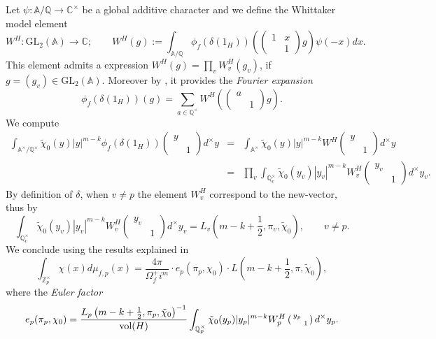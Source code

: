 \documentclass{amsart}
\newcommand{\GL}{{\mathrm{GL}}}
\newcommand{\Z}{{\mathbb Z}}
\newcommand{\A}{{\mathbb A}}
\newcommand{\Q}{{\mathbb Q}}
\newcommand{\C}{{\mathbb C}}
\begin{document}
Let $\psi:\A/\Q\rightarrow\C^\times$ be a global additive character and we define the Whittaker model element
\[
W^H:\GL_2(\A)\longrightarrow\C;\qquad W^H(g):=\int_{\A/\Q}\phi_f(\delta(1_H))\left(\left(\begin{array}{cc}1&x\\&1\end{array}\right)g\right)\psi(-x)dx.
\]
This element admits a expression $W^H(g)=\prod_vW^H_v(g_v)$, if $g=(g_v)\in\GL_2(\A)$. Moreover by \cite[Theorem 3.5.5]{Bump}, it provides the \emph{Fourier expansion} 
\[
\phi_f(\delta(1_H))(g)=\sum_{a\in\Q^\times}W^H\left(\left(\begin{array}{cc}a&\\&1\end{array}\right)g\right).
\]
We compute
\begin{eqnarray*}
\int_{\A^\times/\Q^\times}\tilde\chi_0(y)|y|^{m-k}\phi_f\left(\delta(1_H)\right)\left(\begin{smallmatrix}y&\\&1\end{smallmatrix}\right)d^{\times}y&=&\int_{\A^\times}\tilde\chi_0(y)|y|^{m-k}W^H\left(\begin{smallmatrix}y&\\&1\end{smallmatrix}\right)d^{\times}y\\
&=&\prod_v \int_{\Q_v^\times}\tilde\chi_0(y_v)|y_v|^{m-k}W_v^H\left(\begin{smallmatrix}y_v&\\&1\end{smallmatrix}\right)d^{\times}y_v.
\end{eqnarray*}
By definition of $\delta$, when $v\neq p$ the element $W_v^H$ correspond to the new-vector, thus by \cite[Proposition 3.5.3]{Bump} 
\[
\int_{\Q_v^\times}\tilde\chi_0(y_v)|y_v|^{m-k}W_v^H\left(\begin{smallmatrix}y_v&\\&1\end{smallmatrix}\right)d^{\times}y_v=L_v\left(m-k+\frac{1}{2},\pi_v,\tilde\chi_0\right),\qquad v\neq p.
\]
We conclude using the results explained in \cite[\S 3.5]{Bump} 
\[
\int_{\Z_p^\times}\chi(x)d\mu_{f,p}(x)=\frac{4\pi }{\Omega_f^+i^m}\cdot e_p(\pi_p,\chi_0)\cdot L\left(m-k+\frac{1}{2},\pi,\tilde\chi_0\right),
\]
where the \emph{Euler factor}
\[
e_p(\pi_p,\chi_0)=\frac{L_p\left(m-k+\frac{1}{2},\pi_p,\tilde\chi_0\right)^{-1}}{{\rm vol}(H)}\int_{\Q_p^\times}\tilde\chi_0(y_p)|y_p|^{m-k}W_p^H\left(\begin{smallmatrix}y_p&\\&1\end{smallmatrix}\right)d^{\times}y_p.
\]
\end{document}
